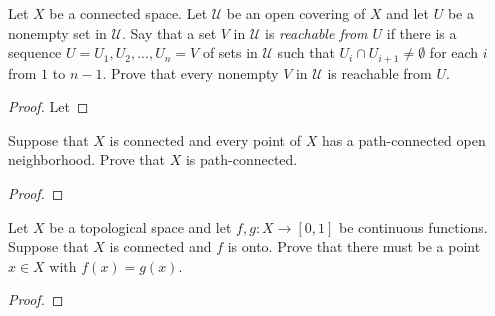 \begin{problem}
Let $X$ be a connected space. Let $\mathcal{U}$ be an open
covering of $X$ and let $U$ be a nonempty set in
$\mathcal{U}$. Say that a set $V$ in $\mathcal{U}$ is
\emph{reachable from $U$} if there is a sequence
$U=U_1,U_2,...,U_n=V$ of sets in $\mathcal{U}$ such that $U_i\cap
U_{i+1}\neq\emptyset$ for each $i$ from $1$ to $n-1$. Prove that
every nonempty $V$ in $\mathcal{U}$ is reachable from $U$.
\end{problem}
\begin{proof}
Let
\end{proof}
\begin{problem}
Suppose that $X$ is connected and every point of $X$ has a
path-connected open neighborhood. Prove that $X$ is
path-connected.
\end{problem}
\begin{proof}
\end{proof}
\begin{problem}
Let $X$ be a topological space and let $f,g\colon X\to[0,1]$ be
continuous functions. Suppose that $X$ is connected and $f$ is
onto. Prove that there must be a point $x\in X$ with
$f(x)=g(x)$.
\end{problem}
\begin{proof}
\end{proof}

